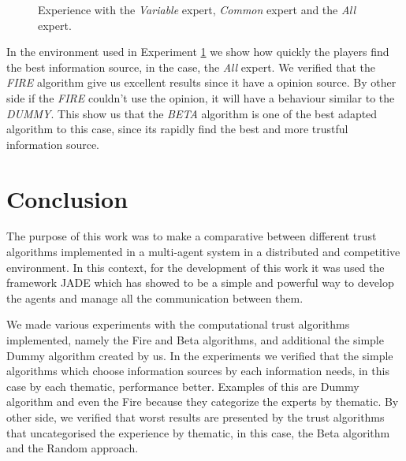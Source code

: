 \documentclass{llncs}
\begin{document}
\begin{figure}
\centering
{}
\caption{Experience with the \textit{Variable} expert, \textit{Common} expert and the \textit{All} expert.}
\label{varyAllCommon}
\end{figure}

In the environment used in Experiment \ref{varyAllCommon} we show how quickly the players find the best information source, in the case, the \textit{All} expert. We verified that the \textit{FIRE} algorithm give us excellent results since it have a opinion source. By other side if the \textit{FIRE} couldn't use the opinion, it will have a behaviour similar to the \textit{DUMMY}. This show us that the \textit{BETA} algorithm is one of the best adapted algorithm to this case, since its rapidly find the best and more trustful information source.

\section{Conclusion}\label{sec:Conclusion}

The purpose of this work was to make a comparative between different trust algorithms implemented in a multi-agent system in a distributed and competitive environment. In this context, for the development of this work it was used the framework JADE which has showed to be a simple and powerful way to develop the agents and manage all the communication between them.

We made various experiments with the computational trust algorithms implemented, namely the Fire and Beta algorithms, and additional the simple Dummy algorithm created by us. In the experiments we verified that the simple algorithms which choose information sources by each information needs, in this case by each thematic, performance better. Examples of this are Dummy algorithm and even the Fire because they categorize the experts by thematic. By other side, we verified that worst results are presented by the trust algorithms that uncategorised the experience by thematic, in this case, the Beta algorithm and the Random approach.
\end{document}
